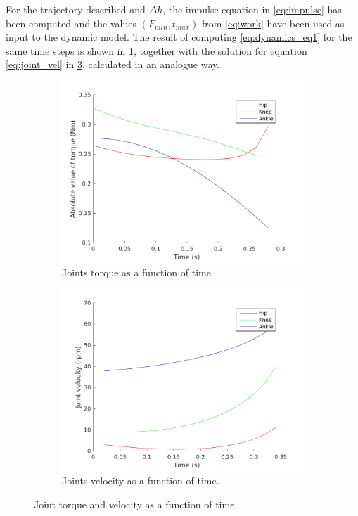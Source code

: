 For the trajectory described and $\Delta h$, the impulse equation in \ref{eq:impulse} has been computed and the values $(F_{min}, t_{max})$ from \ref{eq:work} have been used as input to the dynamic model.
The result of computing \ref{eq:dynamics_eq1} for the same time steps is shown in \ref{fig:controller_torque}, together with the solution for equation \ref{eq:joint_vel} in \ref{fig:controller_speed}, calculated in an analogue way.

\begin{figure}[htb]
    \centering
    \begin{subfigure}{0.49\textwidth}
        \includegraphics[width=\textwidth]{figures/torque-time.pdf}
		\caption{Joints torque as a function of time.}
		\label{fig:controller_torque}
	\end{subfigure}	
    \begin{subfigure}{0.49\textwidth}
        \includegraphics[width=\textwidth]{figures/speed-time.pdf}
		\caption{Joints velocity as a function of time.}
		\label{fig:controller_speed}
    \end{subfigure}
    \caption{Joint torque and velocity as a function of time.}
\end{figure}

